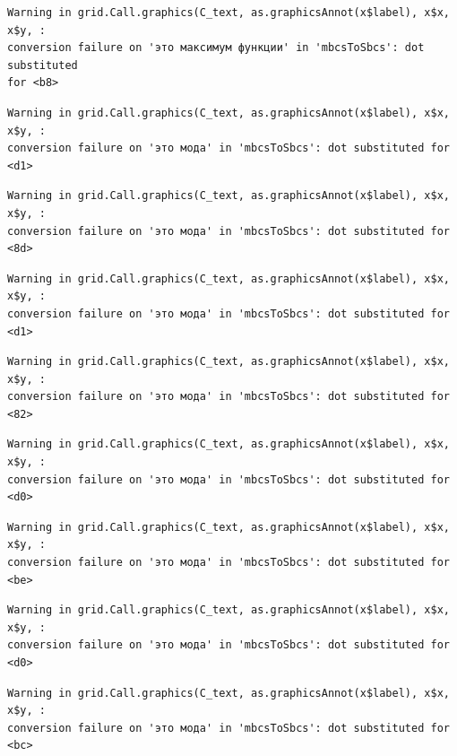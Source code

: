 \documentclass[
  letterpaper,
]{scrbook}
\theoremstyle{definition}
\theoremstyle{remark}
\begin{document}
\begin{verbatim}
Warning in grid.Call.graphics(C_text, as.graphicsAnnot(x$label), x$x, x$y, :
conversion failure on 'это максимум функции' in 'mbcsToSbcs': dot substituted
for <b8>
\end{verbatim}

\begin{verbatim}
Warning in grid.Call.graphics(C_text, as.graphicsAnnot(x$label), x$x, x$y, :
conversion failure on 'это мода' in 'mbcsToSbcs': dot substituted for <d1>
\end{verbatim}

\begin{verbatim}
Warning in grid.Call.graphics(C_text, as.graphicsAnnot(x$label), x$x, x$y, :
conversion failure on 'это мода' in 'mbcsToSbcs': dot substituted for <8d>
\end{verbatim}

\begin{verbatim}
Warning in grid.Call.graphics(C_text, as.graphicsAnnot(x$label), x$x, x$y, :
conversion failure on 'это мода' in 'mbcsToSbcs': dot substituted for <d1>
\end{verbatim}

\begin{verbatim}
Warning in grid.Call.graphics(C_text, as.graphicsAnnot(x$label), x$x, x$y, :
conversion failure on 'это мода' in 'mbcsToSbcs': dot substituted for <82>
\end{verbatim}

\begin{verbatim}
Warning in grid.Call.graphics(C_text, as.graphicsAnnot(x$label), x$x, x$y, :
conversion failure on 'это мода' in 'mbcsToSbcs': dot substituted for <d0>
\end{verbatim}

\begin{verbatim}
Warning in grid.Call.graphics(C_text, as.graphicsAnnot(x$label), x$x, x$y, :
conversion failure on 'это мода' in 'mbcsToSbcs': dot substituted for <be>
\end{verbatim}

\begin{verbatim}
Warning in grid.Call.graphics(C_text, as.graphicsAnnot(x$label), x$x, x$y, :
conversion failure on 'это мода' in 'mbcsToSbcs': dot substituted for <d0>
\end{verbatim}

\begin{verbatim}
Warning in grid.Call.graphics(C_text, as.graphicsAnnot(x$label), x$x, x$y, :
conversion failure on 'это мода' in 'mbcsToSbcs': dot substituted for <bc>
\end{verbatim}
\end{document}
